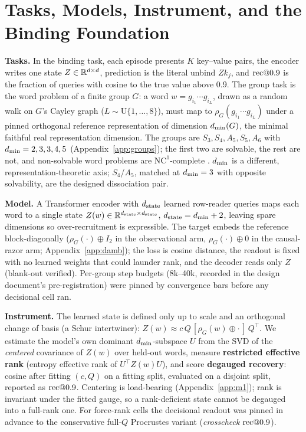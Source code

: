\section{Tasks, Models, Instrument, and the Binding Foundation}
\label{sec:setup}

\textbf{Tasks.} In the binding task, each episode presents $K$
key--value pairs, the encoder writes one state $Z \in \mathbb{R}^{d \times d}$,
prediction is the literal unbind $Z k_j$, and $\mathrm{rec}@0.9$ is the
fraction of queries with cosine to the true value above 0.9. The group
task is the word problem of a finite group $G$: a word
$w = g_{i_1} \cdots g_{i_L}$, drawn as a random walk on $G$'s Cayley
graph ($L \sim \mathrm{U}\{1,\dots,8\}$), must map to
$\rho_G(g_{i_1} \cdots g_{i_L})$ under a pinned orthogonal reference
representation of dimension $d_{\min}(G)$, the minimal faithful real
representation dimension. The groups are $S_3, S_4, A_5, S_5, A_6$ with
$d_{\min} = 2, 3, 3, 4, 5$ (Appendix~\ref{app:groups}); the first two are
solvable, the rest are not, and non-solvable word problems are
$\mathrm{NC}^1$-complete \citep{barrington1989,barringtontherien1988}.
$d_{\min}$ is a different,
representation-theoretic axis; $S_4$/$A_5$, matched at $d_{\min} = 3$ with
opposite solvability, are the designed dissociation pair.

\textbf{Model.} A Transformer encoder with $d_{\mathrm{state}}$ learned row-reader
queries maps each word to a single state
$Z(w) \in \mathbb{R}^{d_{\mathrm{state}} \times d_{\mathrm{state}}}$, $d_{\mathrm{state}} = d_{\min} + 2$, leaving
spare dimensions so over-recruitment is expressible. The target embeds
the reference block-diagonally ($\rho_G(\cdot) \oplus I_2$ in the
observational arm, $\rho_G(\cdot) \oplus 0$ in the causal-razor arm;
Appendix~\ref{app:damb}); the loss is cosine
distance, the readout is fixed with no learned weights that could launder
rank, and the decoder reads only $Z$ (blank-out verified). Per-group
step budgets (8k--40k, recorded in the design document's
pre-registration) were pinned by convergence bars before any decisional
cell ran.

\textbf{Instrument.} The learned state is defined only up to scale and an
orthogonal change of basis (a Schur intertwiner):
$Z(w) \approx c\,Q\,[\rho_G(w) \oplus \cdot\,]\,Q^{\top}$. We estimate the
model's own dominant $d_{\min}$-subspace $U$ from the SVD of the
\emph{centered} covariance of $Z(w)$ over held-out words, measure
\textbf{restricted effective rank} (entropy effective rank of
$U^{\top} Z(w) U$), and score \textbf{degauged recovery}: cosine after
fitting $(c, Q)$ on a fitting split, evaluated on a disjoint split,
reported as $\mathrm{rec}@0.9$. Centering is load-bearing
(Appendix~\ref{app:m1}); rank is invariant under the fitted gauge, so a
rank-deficient state cannot be degauged into a full-rank one. For
force-rank cells the decisional readout was pinned in advance to the
conservative full-$Q$ Procrustes variant (\emph{crosscheck}
$\mathrm{rec}@0.9$).

